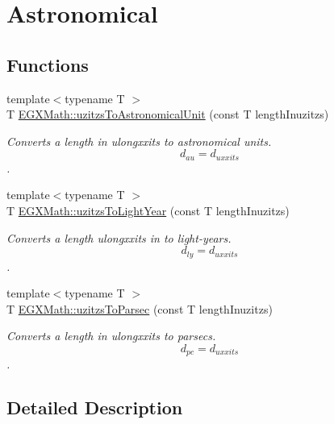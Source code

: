\hypertarget{group___e_g_x_math-_conversions-_length_conversions-uzitzs-_astronomical}{}\section{Astronomical}
\label{group___e_g_x_math-_conversions-_length_conversions-uzitzs-_astronomical}
\subsection*{Functions}
\begin{DoxyCompactItemize}
\item 
{\footnotesize template$<$typename T $>$ }\\T \mbox{\hyperlink{group___e_g_x_math-_conversions-_length_conversions-uzitzs-_astronomical_ga5b92a4634ad3e80173c05bc3ff39f079}{E\+G\+X\+Math\+::uzitzs\+To\+Astronomical\+Unit}} (const T length\+Inuzitzs)
\begin{DoxyCompactList}\small\item\em Converts a length in ulongxxits to astronomical units. \[ d_{au}=d_{uxxits} \]. \end{DoxyCompactList}\item 
{\footnotesize template$<$typename T $>$ }\\T \mbox{\hyperlink{group___e_g_x_math-_conversions-_length_conversions-uzitzs-_astronomical_gaa6ada41d9c8a7516cb5fe8ab01976b27}{E\+G\+X\+Math\+::uzitzs\+To\+Light\+Year}} (const T length\+Inuzitzs)
\begin{DoxyCompactList}\small\item\em Converts a length ulongxxits in to light-\/years. \[ d_{ly}=d_{uxxits} \]. \end{DoxyCompactList}\item 
{\footnotesize template$<$typename T $>$ }\\T \mbox{\hyperlink{group___e_g_x_math-_conversions-_length_conversions-uzitzs-_astronomical_ga028a17a589e3f3d0c09daa6fbe664989}{E\+G\+X\+Math\+::uzitzs\+To\+Parsec}} (const T length\+Inuzitzs)
\begin{DoxyCompactList}\small\item\em Converts a length in ulongxxits to parsecs. \[ d_{pc}=d_{uxxits} \]. \end{DoxyCompactList}\end{DoxyCompactItemize}


\subsection{Detailed Description}


